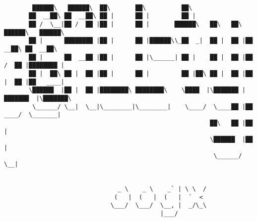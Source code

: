 \documentclass[varwidth=\maxdimen,margin=0.5cm,multi={verbatim}]{standalone}
\begin{document}
\begin{verbatim}

        ██████\   ██████\  ██\       ██\          ██\
       ██  __██\ ██  __██\ ██ |      ██ |         ██ |
       ██ /  \__|██ /  ██ |██ |      ██ |       ██████\   ██\   ██\  ██████\   ██████\
       ██ |      ████████ |██ |      ██ |██████\\_██  _|  ██ |  ██ |██  __██\ ██  __██\
       ██ |      ██  __██ |██ |      ██ |\______| ██ |    ██ |  ██ |██ /  ██ |████████ |
       ██ |  ██\ ██ |  ██ |██ |      ██ |         ██ |██\ ██ |  ██ |██ |  ██ |██   ____|
       \██████  |██ |  ██ |████████\ ████████\    \████  |\███████ |███████  |\███████\
        \______/ \__|  \__|\________|\________|    \____/  \____██ |██  ____/  \_______|
                                                          ██\   ██ |██ |
                                                          \██████  |██ |
                                                           \______/ \__|


                                _ \    _ \    _` | \ \  /
                               (   |  (   |  (   |  `  <
                              \___/  \___/  \__, |  _/\_\
                                            |___/



\end{verbatim}
\end{document}
